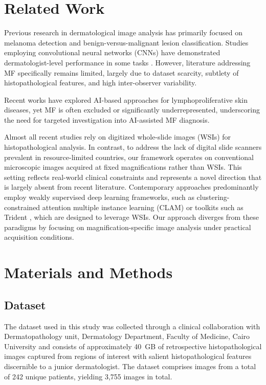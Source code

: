 \documentclass[conference]{IEEEtran}
\begin{document}
\section{Related Work}
Previous research in dermatological image analysis has primarily focused on melanoma detection and benign-versus-malignant lesion classification. 
Studies employing convolutional neural networks (CNNs) have demonstrated dermatologist-level performance in some tasks \cite{Doeleman2024-MF}. 
However, literature addressing MF specifically remains limited, largely due to dataset scarcity, subtlety  of  histopathological features, 
and high inter-observer variability.

Recent works have explored AI-based approaches for lymphoproliferative skin diseases, yet MF is often excluded or significantly underrepresented, underscoring the 
need for targeted investigation into AI-assisted MF diagnosis.

Almost all recent studies rely on digitized whole-slide images (WSIs) for histopathological analysis. In contrast, to address the lack of digital slide 
scanners prevalent in resource-limited countries, our framework operates on conventional microscopic images acquired at fixed magnifications rather than WSIs. 
This setting reflects real-world clinical constraints and represents a novel direction that is largely absent from recent literature. 
Contemporary approaches predominantly employ weakly supervised deep learning frameworks, such as clustering-constrained attention multiple instance 
learning (CLAM) \cite{Lu2021} or toolkits such as Trident \cite{zhang2025standardizing, vaidya2025molecular}, which are designed to leverage WSIs. 
Our approach diverges from these paradigms by focusing on magnification-specific image analysis under practical acquisition conditions.


\section{Materials and Methods}

\subsection{Dataset}
The dataset used in this study was collected through a clinical collaboration with Dermatopathology unit, Dermatology Department,  Faculty of Medicine,  Cairo University  
and consists of approximately 40~GB of retrospective histopathological images captured from regions of interest with salient histopathological features discernible to a junior dermatologist. 
The dataset comprises images from a total of 242 unique patients, yielding 3,755 images in total.
\end{document}
